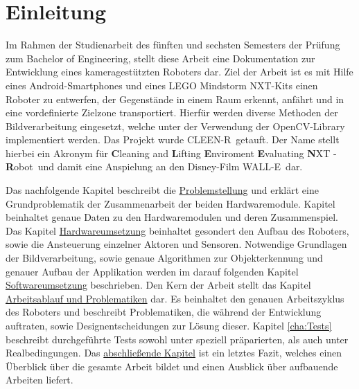 \chapter{Einleitung}
\label{cha:einleitung}

Im Rahmen der Studienarbeit des fünften und sechsten Semesters der Prüfung zum Bachelor of Engineering, stellt diese Arbeit eine Dokumentation zur Entwicklung eines kameragestützten Roboters dar. Ziel der Arbeit ist es mit Hilfe eines Android-Smartphones und eines LEGO Mindstorm NXT-Kits einen Roboter zu entwerfen, der Gegenstände in einem Raum erkennt, anfährt und in eine vordefinierte Zielzone transportiert. Hierfür werden diverse Methoden der Bildverarbeitung eingesetzt, welche unter der Verwendung der OpenCV-Library \cite{opencv_library} implementiert werden. Das Projekt wurde \glqq CLEEN-R\grqq\ getauft. Der Name stellt hierbei ein Akronym für \glqq \textbf{C}leaning and \textbf{L}ifting \textbf{E}nviroment \textbf{E}valuating \textbf{N}XT - \textbf{R}obot\grqq\ und damit eine Anspielung an den Disney-Film \glqq WALL-E\grqq\ dar.

Das nachfolgende Kapitel beschreibt die \hyperref[cha:Problemstellung]{Problemstellung} und erklärt eine Grundproblematik der Zusammenarbeit der beiden Hardwaremodule. Kapitel  beinhaltet genaue Daten zu den Hardwaremodulen und deren Zusammenspiel. Das Kapitel \hyperref[cha:robot]{Hardwareumsetzung} beinhaltet gesondert den Aufbau des Roboters, sowie die Ansteuerung einzelner Aktoren und Sensoren. Notwendige Grundlagen der Bildverarbeitung, sowie genaue Algorithmen zur Objekterkennung und genauer Aufbau der Applikation werden im darauf folgenden Kapitel \hyperref[cha:Software]{Softwareumsetzung} beschrieben. Den Kern der Arbeit stellt das Kapitel \hyperref[cha:Workloop]{Arbeitsablauf und Problematiken} dar. Es beinhaltet den genauen Arbeitszyklus des Roboters und beschreibt Problematiken, die während der Entwicklung auftraten, sowie Designentscheidungen zur Lösung dieser. Kapitel \ref{cha:Tests} beschreibt durchgeführte Tests sowohl unter speziell präparierten, als auch unter Realbedingungen. Das \hyperref[cha:Fazit]{abschließende Kapitel} ist ein letztes Fazit, welches einen Überblick über die gesamte Arbeit bildet und einen Ausblick über aufbauende Arbeiten liefert.



